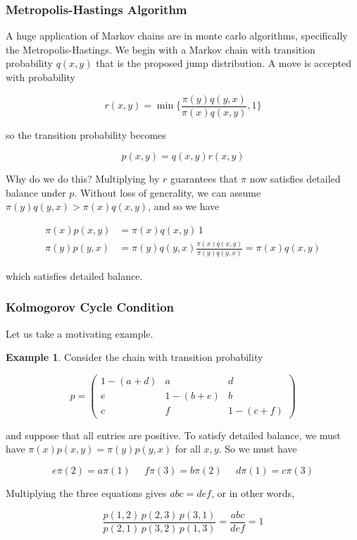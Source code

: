 \documentclass{article}
\theoremstyle{definition}
\newtheorem{example}{Example}[section]
\theoremstyle{remark}
\theoremstyle{definition}
\begin{document}
    \subsubsection{Metropolis-Hastings Algorithm}

      A huge application of Markov chains are in monte carlo algorithms, specifically the Metropolis-Hastings. We begin with a Markov chain with transition probability $q(x, y)$ that is the proposed jump distribution. A move is accepted with probability 

        \[r(x, y) = \min\bigg\{ \frac{\pi(y) q(y, x)}{\pi(x) q(x, y)}, 1 \bigg\}\]

      so the transition probability becomes 

        \[p(x, y) = q(x, y) r(x, y)\]

      Why do we do this? Multiplying by $r$ guarantees that $\pi$ now satisfies detailed balance under $p$. Without loss of generality, we can assume $\pi(y) q(y, x) > \pi(x) q(x, y)$, and so we have 

      \begin{align*}
        \pi(x) p(x, y) & = \pi(x) q(x, y) \,1 \\
        \pi(y) p(y, x) & = \pi(y) q(y, x) \frac{\pi(x) q(x, y)}{\pi(y) q(y, x)} = \pi(x) q(x, y)
      \end{align*}

      which satisfies detailed balance. 

    \subsubsection{Kolmogorov Cycle Condition}

      Let us take a motivating example. 

      \begin{example}
        Consider the chain with transition probability 

          \[p = \begin{pmatrix} 1 - (a + d) & a & d \\ e & 1 - (b + e) & b \\ c & f & 1 - (c + f) \end{pmatrix}\]

        and suppose that all entries are positive. To satisfy detailed balance, we must have $\pi(x) p(x, y) = \pi(y) p(y, x)$ for all $x, y$. So we must have

          \[e \pi(2) = a \pi(1) \;\;\;\;\; f \pi(3) = b \pi(2) \;\;\;\;\; d \pi(1) = c \pi(3)\]

        Multiplying the three equations gives $abc = def$, or in other words, 

          \[\frac{p(1, 2) \, p(2, 3) \, p(3, 1)}{p(2, 1)\, p(3, 2) \, p(1, 3)} = \frac{abc}{def} = 1\]
      \end{example}
\end{document}

